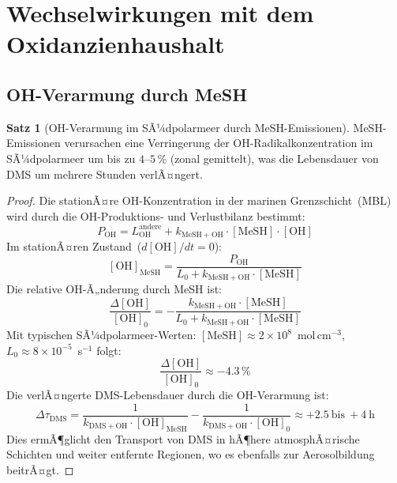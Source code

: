 ﻿\documentclass[a4paper,12pt]{article}
\theoremstyle{definition}
\newtheorem{satz}{Satz}
\begin{document}
\section{Wechselwirkungen mit dem Oxidanzienhaushalt}

\subsection{OH-Verarmung durch MeSH}

\begin{satz}[OH-Verarmung im SÃ¼dpolarmeer durch MeSH-Emissionen]
  \label{satz:oh}
  MeSH-Emissionen verursachen eine Verringerung der OH-Radikalkonzentration im SÃ¼dpolarmeer um
  bis zu $4$--$5\,\%$ (zonal gemittelt), was die Lebensdauer von DMS um mehrere Stunden verlÃ¤ngert.
\end{satz}

\begin{proof}
  Die stationÃ¤re OH-Konzentration in der marinen Grenzschicht~(MBL) wird durch die
  OH-Produktions- und Verlustbilanz bestimmt:
  \[
    P_{\mathrm{OH}} = L_{\mathrm{OH}}^{\mathrm{andere}} + k_{\mathrm{MeSH+OH}} \cdot [\mathrm{MeSH}] \cdot [\mathrm{OH}]
  \]
  Im stationÃ¤ren Zustand~($d[\mathrm{OH}]/dt = 0$):
  \[
    [\mathrm{OH}]_{\mathrm{MeSH}} = \frac{P_{\mathrm{OH}}}{L_0 + k_{\mathrm{MeSH+OH}} \cdot [\mathrm{MeSH}]}
  \]
  Die relative OH-Ã„nderung durch MeSH ist:
  \[
    \frac{\Delta[\mathrm{OH}]}{[\mathrm{OH}]_0} = -\frac{k_{\mathrm{MeSH+OH}} \cdot [\mathrm{MeSH}]}{L_0 + k_{\mathrm{MeSH+OH}} \cdot [\mathrm{MeSH}]}
  \]
  Mit typischen SÃ¼dpolarmeer-Werten: $[\mathrm{MeSH}] \approx 2 \times 10^8$~mol\,cm$^{-3}$,
  $L_0 \approx 8 \times 10^{-5}$~s$^{-1}$ folgt:
  \[
    \frac{\Delta[\mathrm{OH}]}{[\mathrm{OH}]_0} \approx -4.3\,\%
  \]
  Die verlÃ¤ngerte DMS-Lebensdauer durch die OH-Verarmung ist:
  \[
    \Delta\tau_{\mathrm{DMS}} = \frac{1}{k_{\mathrm{DMS+OH}} \cdot [\mathrm{OH}]_{\mathrm{MeSH}}} - \frac{1}{k_{\mathrm{DMS+OH}} \cdot [\mathrm{OH}]_0} \approx +2.5\ \text{bis}\ +4\ \text{h}
  \]
  Dies ermÃ¶glicht den Transport von DMS in hÃ¶here atmosphÃ¤rische Schichten und weiter entfernte
  Regionen, wo es ebenfalls zur Aerosolbildung beitrÃ¤gt. \qedhere
\end{proof}
\end{document}

